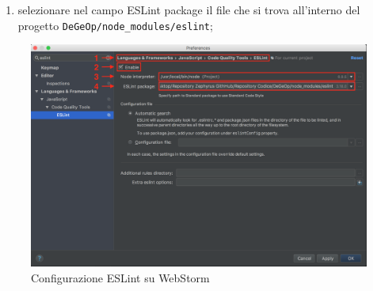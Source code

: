 \begin{enumerate}
\begin{enumerate}
				\item selezionare nel campo ESLint package il file che si trova all'interno del progetto \texttt{DeGeOp/node_modules/eslint};
			\end{enumerate}
			\begin{figure}[H]
				\centering 
				\includegraphics[width=1\columnwidth]{img/configESLint.png}
				\caption{Configurazione ESLint \progetto su WebStorm}
			\end{figure}
	\end{enumerate}
	
